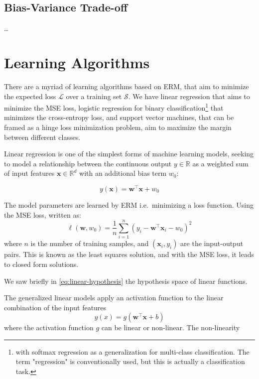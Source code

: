 \subsection{Bias-Variance Trade-off}

\dots

\section{Learning Algorithms}
There are a myriad of learning algorithms based on \gls{ERM}, that aim to minimize the expected loss $\mathcal{L}$ over a training set $\mathcal{S}$.  We have linear regression that aims to minimize the \gls{MSE} loss, logistic regression for binary classification\footnote{with softmax regression as a generalization for multi-class classification. The term "regression" is conventionally used, but this is actually a classification task.} that minimizes the cross-entropy loss, and support vector machines, that can be framed as a hinge loss minimization problem, aim to maximize the margin between different classes.


Linear regression is one of the simplest forms of machine learning models, seeking to model a relationship between the continuous output $y \in \mathbb{R}$ as a weighted sum of input features $\mathbf{x} \in \mathbb{R}^d$ with an additional bias term $w_0$:

\begin{equation}\label{eq:linear-regression}
    y(\mathbf{x}) = \mathbf{w}^\top \mathbf{x} + w_0
\end{equation}

The model parameters are learned by \gls{ERM} i.e.\ minimizing a loss function. Using the \gls{MSE} loss, written as:
\begin{equation}\label{eq:mse-loss}
    \ell(\mathbf{w}, w_0) = \frac{1}{n} \sum_{i=1}^{n} (y_i - \mathbf{w}^\top \mathbf{x}_i - w_0)^2
\end{equation}
where $n$ is the number of training samples, and $(\mathbf{x}_i, y_i)$ are the input-output pairs. This is known as the least squares solution, and with the MSE loss, it leads to closed form solutions.

We saw briefly in \cref{eq:linear-hypothesis} the hypothesis space of linear functions. 

The generalized linear models apply an activation function to the linear combination of the input features
\begin{equation}
    y(x) = g(\mathbf{w}^\top \mathbf{x} + b)
\end{equation}
where the activation function $g$ can be linear or non-linear. The non-linearity 

